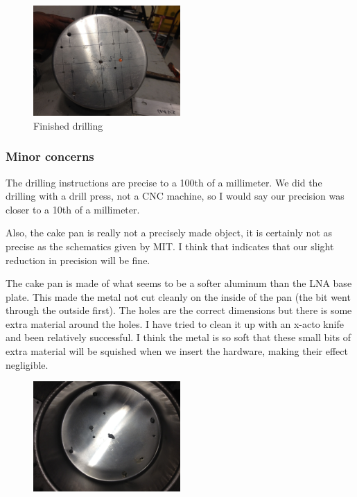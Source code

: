 \documentclass[11pt]{article} %
\begin{document}
\begin{figure}
  \centering
  \caption{ Finished drilling }
  \includegraphics[width=0.50\textwidth]{feed/07.jpeg}
\end{figure}



\subsubsection{Minor concerns}
The drilling instructions are precise to a 100th of a millimeter. We did the drilling with a drill press, not a CNC machine, so I would say our precision was closer to a 10th of a millimeter.

Also, the cake pan is really not a precisely made object, it is certainly not as precise as the schematics given by MIT. I think that indicates that our slight reduction in precision will be fine.

The cake pan is made of what seems to be a softer aluminum than the LNA base plate. This made the metal not cut cleanly on the inside of the pan (the bit went through the outside first). The holes are the correct dimensions but there is some extra material around the holes. I have tried to clean it up with an x-acto knife and been relatively successful. I think the metal is so soft that these small bits of extra material will be squished when we insert the hardware, making their effect negligible. 

\begin{figure}
  \centering
  \caption{  }
  \includegraphics[width=0.50\textwidth]{feed/08.jpeg}
\end{figure}
\end{document}
